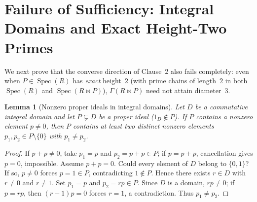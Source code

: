 \documentclass[11pt]{article}
\newtheorem{lemma}[theorem]{Lemma}
\theoremstyle{definition}
\newcommand{\Spec}{\operatorname{Spec}}
\begin{document}
\section{Failure of Sufficiency: Integral Domains and Exact Height-Two Primes}

We next prove that the converse direction of Clause~2 also fails completely: even when
$P \in \Spec(R)$ has \emph{exact} height~$2$ (with prime chains of length~$2$ in both
$\Spec(R)$ and $\Spec(R \bowtie P)$), $\Gamma(R \bowtie P)$ need not attain diameter~$3$.

\begin{lemma}[Nonzero proper ideals in integral domains]\label{lem:domain-two-elems}
Let $D$ be a commutative integral domain and let $P \subsetneq D$ be a proper ideal
($1_D \notin P$). If $P$ contains a nonzero element $p \neq 0$, then $P$ contains at least
two distinct nonzero elements $p_1, p_2 \in P \setminus \{0\}$ with $p_1 \neq p_2$.
\end{lemma}
\begin{proof}
If $p + p \neq 0$, take $p_1 = p$ and $p_2 = p + p \in P$; if $p = p + p$, cancellation
gives $p = 0$, impossible. Assume $p + p = 0$. Could every element of $D$ belong to
$\{0, 1\}$? If so, $p \neq 0$ forces $p = 1 \in P$, contradicting $1 \notin P$. Hence
there exists $r \in D$ with $r \neq 0$ and $r \neq 1$. Set $p_1 = p$ and $p_2 = r p \in P$.
Since $D$ is a domain, $r p \neq 0$; if $p = r p$, then $(r - 1) p = 0$ forces $r = 1$,
a contradiction. Thus $p_1 \neq p_2$.
\end{proof}
\end{document}

